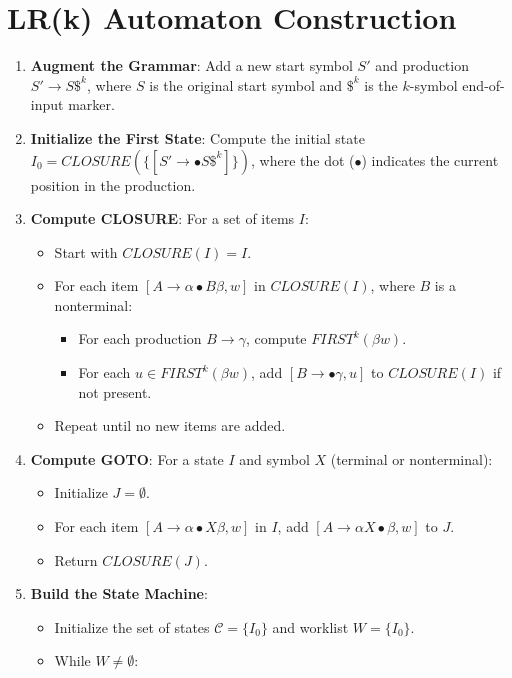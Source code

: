 \section{LR(k) Automaton Construction}

\begin{enumerate}
\item \textbf{Augment the Grammar}: Add a new start symbol $S'$ and production $S' \to S \$^k$, where $S$ is the original start symbol and $\$^k$ is the $k$-symbol end-of-input marker.
\item \textbf{Initialize the First State}: Compute the initial state $I_0 = CLOSURE(\{[S' \to \bullet S \$^k]\})$, where the dot ($\bullet$) indicates the current position in the production.
\item \textbf{Compute CLOSURE}: For a set of items $I$:
   \begin{itemize}
   \item Start with $CLOSURE(I) = I$.
   \item For each item $[A \to \alpha \bullet B \beta, w]$ in $CLOSURE(I)$, where $B$ is a nonterminal:
     \begin{itemize}
     \item For each production $B \to \gamma$, compute $FIRST^k(\beta w)$.
     \item For each $u \in FIRST^k(\beta w)$, add $[B \to \bullet \gamma, u]$ to $CLOSURE(I)$ if not present.
     \end{itemize}
   \item Repeat until no new items are added.
   \end{itemize}
\item \textbf{Compute GOTO}: For a state $I$ and symbol $X$ (terminal or nonterminal):
   \begin{itemize}
   \item Initialize $J = \emptyset$.
   \item For each item $[A \to \alpha \bullet X \beta, w]$ in $I$, add $[A \to \alpha X \bullet \beta, w]$ to $J$.
   \item Return $CLOSURE(J)$.
   \end{itemize}
\item \textbf{Build the State Machine}:
   \begin{itemize}
   \item Initialize the set of states $\mathcal{C} = \{I_0\}$ and worklist $W = \{I_0\}$.
   \item While $W \neq \emptyset$:
     \begin{itemize}

\end{itemize}
\end{itemize}
\end{enumerate}
